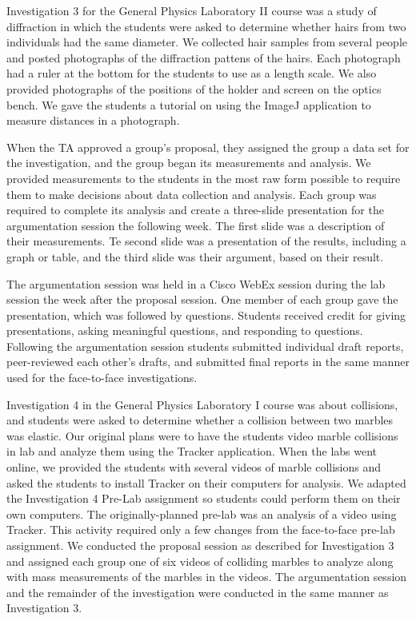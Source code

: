 \documentclass[aip, numerical, preprint]{revtex4-2}
\begin{document}
Investigation 3 for the General Physics Laboratory II course was a study of diffraction in
which the students were asked to determine whether hairs from two individuals had the same
diameter. We collected hair samples from several people and posted photographs of the
diffraction pattens of the hairs. Each photograph had a ruler at the bottom for the students to
use as a length scale. We also provided photographs of the positions of the holder and screen
on the optics bench. We gave the students a tutorial on using the ImageJ
application\citep{schrasetal12} to measure distances in a photograph.

When the TA approved a group's proposal, they assigned the group a data set for the
investigation, and the group began its measurements and analysis. We provided measurements to
the students in the most raw form possible to require them to make decisions about data
collection and analysis. Each group was required to complete its analysis and create a
three-slide presentation for the argumentation session the following week. The first slide was
a description of their measurements. Te second slide was a presentation of the results,
including a graph or table, and the third slide was their argument, based on their result.

The argumentation session was held in a Cisco WebEx session during the lab session the week
after the proposal session. One member of each group gave the presentation, which was followed
by questions. Students received credit for giving presentations, asking meaningful questions,
and responding to questions.  Following the argumentation session students submitted individual
draft reports, peer-reviewed each other's drafts, and submitted final reports in the same
manner used for the face-to-face investigations.

Investigation 4 in the General Physics Laboratory I course was about collisions, and students
were asked to determine whether a collision between two marbles was elastic. Our original plans
were to have the students video marble collisions in lab and analyze them using the Tracker
application\citep{bro2009}. When the labs went online, we provided the students with several
videos of marble collisions and asked the students to install Tracker on their computers for
analysis.  We adapted the Investigation 4 Pre-Lab assignment so students could perform them on
their own computers. The originally-planned pre-lab was an analysis of a video using
Tracker. This activity required only a few changes from the face-to-face pre-lab assignment. We
conducted the proposal session as described for Investigation 3 and assigned each group one of
six videos of colliding marbles to analyze along with mass measurements of the marbles in the
videos. The argumentation session and the remainder of the investigation were conducted in the
same manner as Investigation 3.
\end{document}
